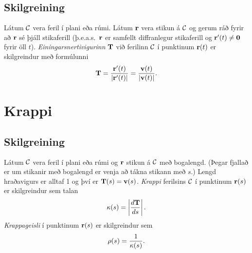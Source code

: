 \documentclass[a4paper,10pt,icelandic]{sphinxmanual}
\begin{document}
\subsection{Skilgreining}
\label{Kafli1:index-14}\label{Kafli1:id14}
Látum \(\cal C\) vera feril í plani eða rúmi. Látum
\(\mbox{${\bf r}$}\) vera stikun á \(\cal C\) og gerum ráð fyrir
að \(\mbox{${\bf r}$}\) sé þjáll stikaferill
(þ.e.a.s. \(\mbox{${\bf r}$}\) er samfellt diffranlegur stikaferill
og \(\mbox{${\bf r}$}'(t)\neq \mbox{${\bf 0}$}\) fyrir öll
\(t\)). \emph{Einingarsnertivigurinn} \(\mbox{${\bf T}$}\) við
ferilinn \(\cal C\) í punktinum \(\mbox{${\bf r}$}(t)\) er
skilgreindur með formúlunni
\begin{gather}
\begin{split}\displaystyle \mbox{${\bf T}$}=\frac{\mbox{${\bf r}$}'(t)}{|\mbox{${\bf r}$}'(t)|}=\frac{\mbox{${\bf v}$}(t)}{|\mbox{${\bf v}$}(t)|}.\end{split}\notag
\end{gather}

\section{Krappi}
\label{Kafli1:krappi}

\subsection{Skilgreining}
\label{Kafli1:index-15}\label{Kafli1:id15}
Látum \(\cal C\) vera feril í plani eða rúmi og
\(\mbox{${\bf r}$}\) stikun á \(\cal C\) með bogalengd. (Þegar
fjallað er um stikanir með bogalengd er venja að tákna stikann með
\(s\).) Lengd hraðavigurs er alltaf 1 og því er
\(\mbox{${\bf T}$}(s)=\mbox{${\bf v}$}(s)\). \textit{Krappi}
ferilsins \(\cal
C\) í punktinum \(\mbox{${\bf r}$}(s)\) er skilgreindur sem talan
\begin{gather}
\begin{split}\displaystyle \kappa(s)=\left|\frac{d\mbox{${\bf T}$}}{ds}\right|.\end{split}\notag
\end{gather}
\textit{Krappageisli} í punktinum
\(\mbox{${\bf r}$}(s)\) er skilgreindur sem
\begin{gather}
\begin{split}\displaystyle \rho(s)=\frac{1}{\kappa(s)}.\end{split}\notag
\end{gather}
\end{document}

